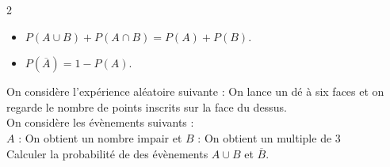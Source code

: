 \begin{minipage}[c]{0.3\linewidth}
\begin{center}  
\end{center}

\end{minipage}


\begin{Théorème}
\leavevmode\vspace{-\baselineskip}
\begin{multicols}{2}
\begin{itemize}[label=\textcolor{Couleur1}{$\bullet$}]
\item $P(A\cup B)+P(A\cap B)=P(A)+P(B)$.
\item $P(\overline{A})=1-P(A)$.
\end{itemize}
\end{multicols}
\end{Théorème}

\begin{Exemple}
On considère l'expérience aléatoire suivante :
On lance un dé à six faces et on regarde le nombre de points inscrits sur la face du dessus.\\
On considère les évènements suivants :\\
$A$ : \og On obtient un nombre impair \fg{}
et $B$ : \og On obtient un multiple de $3$ \fg{} \\
Calculer la probabilité de des évènements $A\cup B$ et $\overline{B}$.

\vspace{0.3cm}

\ligne

\ligne

\ligne

\ligne

\ligne

\ligne

\ligne

\ligne

\ligne

\end{Exemple}

